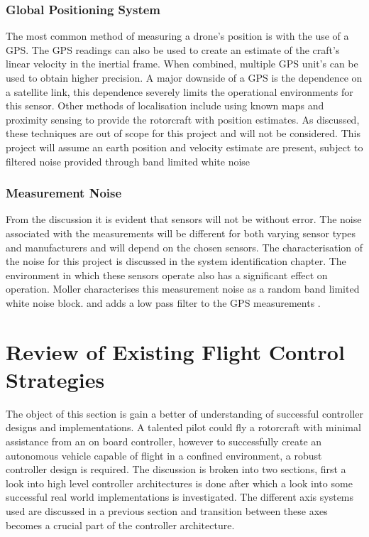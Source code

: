 		\subsubsection{Global Positioning System}
		The most common method of measuring a drone's position is with the use of a GPS. The GPS readings can also be used to create an estimate of the craft's linear velocity in the inertial frame. When combined, multiple GPS unit's can be used to obtain higher precision. A major downside of a GPS is the dependence on a satellite link, this dependence severely limits the operational environments for this sensor. Other methods of localisation include using known maps and proximity sensing to provide the rotorcraft with position estimates. As discussed, these techniques are out of scope for this project and will not be considered. This project will assume an earth position and velocity estimate are present, subject to filtered noise provided through band limited white noise \cite{Moller2015}
		
		\subsubsection{Measurement Noise}
		From the discussion it is evident that sensors will not be without error. The noise associated with the measurements will be different for both varying sensor types and manufacturers and will depend on the chosen sensors. The characterisation of the noise for this project is discussed in the system identification chapter. The environment in which these sensors operate also has a significant effect on operation. Moller characterises this measurement noise as a random band limited white noise block. and adds a low pass filter to the GPS measurements \cite{Moller2015}.
	
\section{Review of Existing Flight Control Strategies}\label{SECT_ControlReview}
The object of this section is gain a better of understanding of successful controller designs and implementations. A talented pilot could fly a rotorcraft with minimal assistance from an on board controller, however to successfully create an autonomous vehicle capable of flight in a confined environment, a robust controller design is required. The discussion is broken into two sections, first a look into high level controller architectures is done after which a look into some successful real world implementations is investigated. The different axis systems used are discussed in a previous section and transition between these axes becomes a crucial part of the controller architecture.

